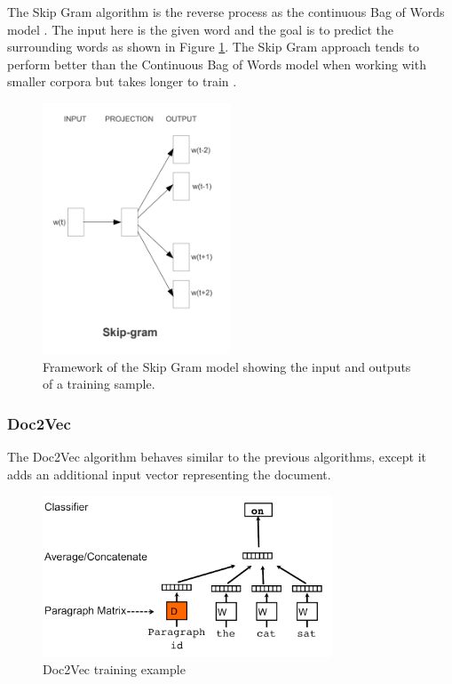 \documentclass[5p,authoryear]{elsarticle}
\begin{document}
The Skip Gram algorithm is the reverse process as the continuous Bag of Words model \citep{word2vec}. 
The input here is the given word and the goal is to predict the surrounding words as shown in Figure \ref{skip}.
The Skip Gram approach tends to perform better than the Continuous Bag of Words model when working with smaller corpora but takes longer to train \citep{lane}.

\begin{figure}[!h] 
    \centering
	\includegraphics[width=2.2in]{figures/skip_gram.png}
	\caption[]{Framework of the Skip Gram model showing the input and outputs of a training sample.} 
	\label{skip} 
\end{figure}



\subsubsection{Doc2Vec}\label{Doc2Vec}

The Doc2Vec algorithm behaves similar to the previous algorithms, except it adds an additional input vector representing the document.\\



\begin{figure}[!h] 
    \centering
	\includegraphics[width=3.4in]{figures/doc2vec_2.png}
	\caption[]{Doc2Vec training example} 
	\label{Doc2Vec2} 
\end{figure}
\end{document}
